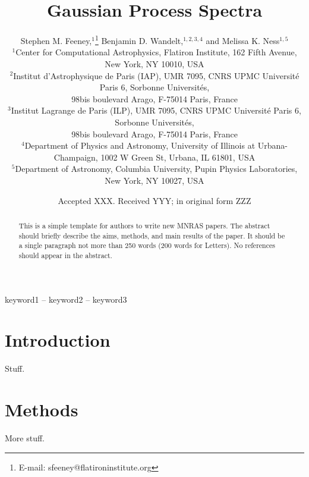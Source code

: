 \documentclass[a4paper,fleqn,usenatbib]{mnras}
\title[Gaussian Process Spectra]{Gaussian Process Spectra}
\author[S. M. Feeney et al.]{
Stephen M. Feeney,$^{1}$\thanks{E-mail: sfeeney@flatironinstitute.org}
Benjamin D. Wandelt,$^{1,2,3,4}$
and Melissa K. Ness$^{1,5}$
\\
$^{1}$Center for Computational Astrophysics, Flatiron Institute, 162 Fifth Avenue, New York, NY 10010, USA\\
$^{2}$Institut d'Astrophysique de Paris (IAP), UMR 7095, CNRS UPMC Universit\'e Paris 6, Sorbonne Universit\'es, \\
98bis boulevard Arago, F-75014 Paris, France\\
$^{3}$Institut Lagrange de Paris (ILP), UMR 7095, CNRS UPMC Universit\'e Paris 6, Sorbonne Universit\'es, \\
98bis boulevard Arago, F-75014 Paris, France\\
$^{4}$Department of Physics and Astronomy, University of Illinois at Urbana-Champaign, 1002 W Green St, Urbana, IL 61801, USA\\
$^{5}$Department of Astronomy, Columbia University, Pupin Physics Laboratories, New York, NY 10027, USA
}
\date{Accepted XXX. Received YYY; in original form ZZZ}
\begin{document}
\label{firstpage}
\pagerange{\pageref{firstpage}--\pageref{lastpage}}
\maketitle

\begin{abstract}
This is a simple template for authors to write new MNRAS papers.
The abstract should briefly describe the aims, methods, and main results of the paper.
It should be a single paragraph not more than 250 words (200 words for Letters).
No references should appear in the abstract.
\end{abstract}

\begin{keywords}
keyword1 -- keyword2 -- keyword3
\end{keywords}


\section{Introduction}

Stuff.


\section{Methods}

More stuff.
\end{document}
